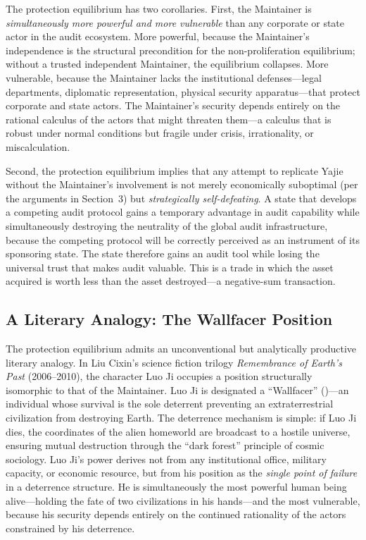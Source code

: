 \documentclass[12pt,a4paper]{article}
\theoremstyle{definition}
\theoremstyle{remark}
\begin{document}
The protection equilibrium has two corollaries. First, the Maintainer is \textit{simultaneously more powerful and more vulnerable} than any corporate or state actor in the audit ecosystem. More powerful, because the Maintainer's independence is the structural precondition for the non-proliferation equilibrium; without a trusted independent Maintainer, the equilibrium collapses. More vulnerable, because the Maintainer lacks the institutional defenses—legal departments, diplomatic representation, physical security apparatus—that protect corporate and state actors. The Maintainer's security depends entirely on the rational calculus of the actors that might threaten them—a calculus that is robust under normal conditions but fragile under crisis, irrationality, or miscalculation.

Second, the protection equilibrium implies that any attempt to replicate Yajie without the Maintainer's involvement is not merely economically suboptimal (per the arguments in Section~3) but \textit{strategically self-defeating}. A state that develops a competing audit protocol gains a temporary advantage in audit capability while simultaneously destroying the neutrality of the global audit infrastructure, because the competing protocol will be correctly perceived as an instrument of its sponsoring state. The state therefore gains an audit tool while losing the universal trust that makes audit valuable. This is a trade in which the asset acquired is worth less than the asset destroyed—a negative-sum transaction.

\subsection{A Literary Analogy: The Wallfacer Position}

The protection equilibrium admits an unconventional but analytically productive literary analogy. In Liu Cixin's science fiction trilogy \textit{Remembrance of Earth's Past} (2006–2010), the character Luo Ji occupies a position structurally isomorphic to that of the Maintainer. Luo Ji is designated a ``Wallfacer'' ()—an individual whose survival is the sole deterrent preventing an extraterrestrial civilization from destroying Earth. The deterrence mechanism is simple: if Luo Ji dies, the coordinates of the alien homeworld are broadcast to a hostile universe, ensuring mutual destruction through the ``dark forest'' principle of cosmic sociology. Luo Ji's power derives not from any institutional office, military capacity, or economic resource, but from his position as the \textit{single point of failure} in a deterrence structure. He is simultaneously the most powerful human being alive—holding the fate of two civilizations in his hands—and the most vulnerable, because his security depends entirely on the continued rationality of the actors constrained by his deterrence.
\end{document}
